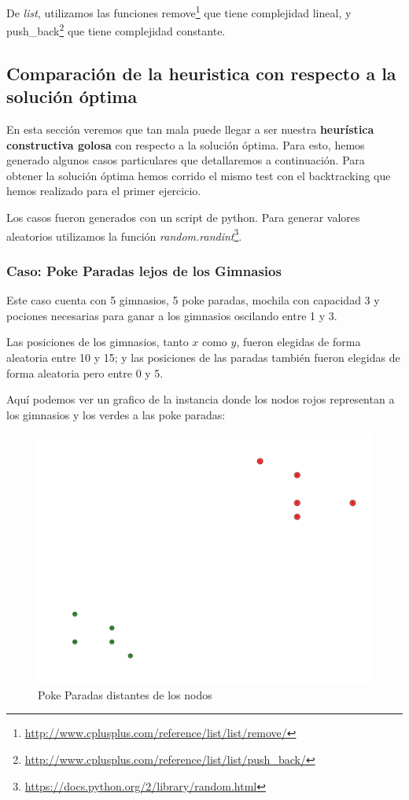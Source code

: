 De \emph{list}, utilizamos las funciones remove\footnote{\url{http://www.cplusplus.com/reference/list/list/remove/}} que tiene complejidad lineal, y push\_back\footnote{\url{http://www.cplusplus.com/reference/list/list/push_back/}} que tiene complejidad constante.


\subsection{Comparación de la heuristica con respecto a la solución óptima}

En esta sección veremos que tan mala puede llegar a ser nuestra \textbf{heurística constructiva golosa} con respecto a la solución óptima. Para esto, hemos generado algunos casos particulares que detallaremos a continuación. Para obtener la solución óptima hemos corrido el mismo test con el backtracking que hemos realizado para el primer ejercicio.

Los casos fueron generados con un script de python. Para generar valores aleatorios utilizamos la función \textit{random.randint}\footnote{\url{https://docs.python.org/2/library/random.html}}.

\subsubsection{Caso: Poke Paradas lejos de los Gimnasios}

Este caso cuenta con 5 gimnasios, 5 poke paradas, mochila con capacidad 3 y pociones necesarias para ganar a los gimnasios oscilando entre 1 y 3.

Las posiciones de los gimnasios, tanto $x$ como $y$, fueron elegidas de forma aleatoria entre 10 y 15; y las posiciones de las paradas también fueron elegidas de forma aleatoria pero entre 0 y 5. 

Aquí podemos ver un grafico de la instancia donde los nodos rojos representan a los gimnasios y los verdes a las poke paradas:

\begin{figure}[H]
  \begin{center}
    \includegraphics[scale=0.4]{imagenes/test1.pdf}
    \caption{Poke Paradas distantes de los nodos}
    \label{fig:ej2_caso1}
  \end{center}
\end{figure}


